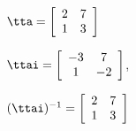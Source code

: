 {$\tta = \left[
\begin{array}{cc}
   2 & 7\\
   1 & 3
\end{array}\right]$
}
{$\ttai = \left[
\begin{array}{cc}
-3 & 7\\
1 & -2 \end{array}
\right]$,

$(\ttai)^{-1} = \left[
\begin{array}{cc}
 2 & 7\\
   1 & 3
 \end{array}\right]$
}
